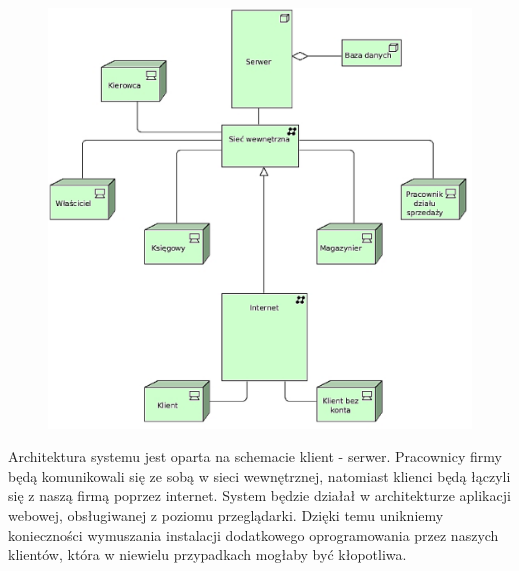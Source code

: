 	\begin{figure}[H]
		\centering
		\includegraphics[width=1.1\textwidth]{img/architektura.eps}
	\end{figure}

Architektura systemu jest oparta na schemacie klient - serwer. Pracownicy firmy będą komunikowali się ze sobą w sieci wewnętrznej, natomiast klienci będą łączyli się z naszą firmą poprzez internet. System będzie działał w architekturze aplikacji webowej, obsługiwanej z poziomu przeglądarki. Dzięki temu unikniemy konieczności wymuszania instalacji dodatkowego oprogramowania przez naszych klientów, która w niewielu przypadkach mogłaby być kłopotliwa. 